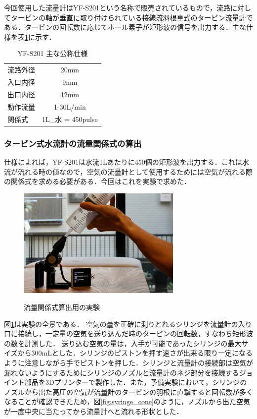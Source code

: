 今回使用した流量計はYF-S201という名称で販売されているもので，流路に対してタービンの軸が垂直に取り付けられている接線流羽根車式のタービン流量計である．タービンの回転数に応じてホール素子が矩形波の信号を出力する．主な仕様を表\ref{tb:YFS201_specsheet}に示す．

\begin{table}[h]
  \begin{center}
  \caption{YF-S201 主な公称仕様}
  \label{tb:YFS201_specsheet}
    \begin{tabular}{lc}
      流路外径 & 20mm \\
      入口内径 & 9mm \\
      出口内径 & 12mm \\
      動作流量 & 1-30L/min \\
      関係式 & 1L_{水} = 450pulse
    \end{tabular}
  \end{center}
\end{table}

\subsubsection{タービン式水流計の流量関係式の算出}

仕様によれば，YF-S201は水流1Lあたりに450個の矩形波を出力する．これは水流が流れる時の値なので，空気の流量計として使用するためには空気が流れる際の関係式を求める必要がある．今回はこれを実験で求めた．

\begin{figure}[h]
  \begin{center}
    \label{fig:flowsensor_calibrate}
    \includegraphics[width=8cm]{fig/flowsensor_calibrate.png}
    \caption{流量関係式算出用の実験}
  \end{center}
\end{figure}

図\ref{fig:flowsensor_calibrate}は実験の全景である．
空気の量を正確に測りとれるシリンジを流量計の入り口に接続し，一定量の空気を送り込んだ時のタービンの回転数，すなわち矩形波の数を計測した．
送り込む空気の量は，入手が可能であったシリンジの最大サイズから300mLとした．シリンジのピストンを押す速さが出来る限り一定になるように注意しながら手でピストンを押した．シリンジと流量計の接続部は空気が漏れないようにするためにシリンジのノズルと流量計のネジ部分を接続するジョイント部品を3Dプリンターで製作した．また，予備実験において，シリンジのノズルから出た高圧の空気が流量計のタービンの羽根に直撃すると回転数が多くなることが確認できたため，図\ref{fig:syringe_cone}のように，ノズルから出た空気が一度中央に当たってから流量計へと流れる形状とした．

